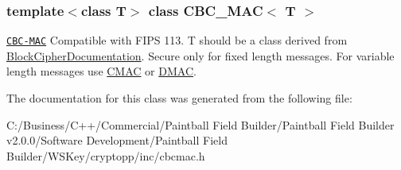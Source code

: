 \subsubsection*{template$<$class T$>$ class CBC\_\-MAC$<$ T $>$}

\href{http://www.weidai.com/scan-mirror/mac.html#CBC-MAC}{\tt CBC-\/MAC} Compatible with FIPS 113. T should be a class derived from \hyperlink{struct_block_cipher_documentation}{BlockCipherDocumentation}. Secure only for fixed length messages. For variable length messages use \hyperlink{class_c_m_a_c}{CMAC} or \hyperlink{class_d_m_a_c}{DMAC}. 

The documentation for this class was generated from the following file:\begin{DoxyCompactItemize}
\item 
C:/Business/C++/Commercial/Paintball Field Builder/Paintball Field Builder v2.0.0/Software Development/Paintball Field Builder/WSKey/cryptopp/inc/cbcmac.h\end{DoxyCompactItemize}
